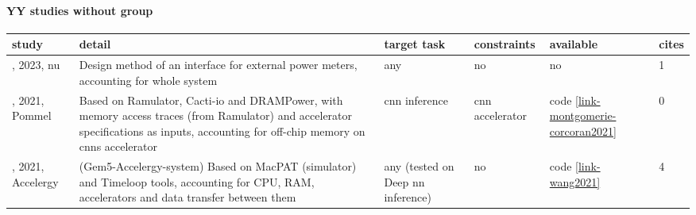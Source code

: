 \paragraph{YY studies without group} 
 \label{tab:YY-other} 
\begin{longtable}{|>{\raggedright\arraybackslash}p{2cm}|p{5.9cm}|>{\raggedright\arraybackslash}p{1.85cm}|>{\raggedright\arraybackslash}p{2cm}|>{\raggedright\arraybackslash}p{1.5cm}|p{0.7cm}|}
\toprule
\bfseries study & \bfseries detail & \bfseries target task & \bfseries constraints & \bfseries available & \bfseries cites \\
\midrule 
\endhead
\cite{ortega2023}, 2023, \acrshort{nu} & Design method of an interface for external power meters, accounting for whole system & any & no & no & 1 \\
\cite{montgomerie-corcoran2021}, 2021, Pommel & Based on Ramulator, Cacti-io and DRAMPower, with memory access traces (from Ramulator) and accelerator specifications as inputs, accounting for off-chip memory on \acrshort{cnn}s accelerator & \acrshort{cnn} inference & \acrshort{cnn} accelerator & code \href{https://github.com/AlexMontgomerie/pommel}{\ref*{link-montgomerie-corcoran2021}} & 0 \\
\cite{wang2021}, 2021, Accelergy & (Gem5-Accelergy-system) Based on MacPAT (simulator) and Timeloop tools, accounting for CPU, RAM, accelerators and data transfer between them & any (tested on Deep \acrshort{nn} inference) & no & code \href{https://github.com/Accelergy-Project/accelergy}{\ref*{link-wang2021}} & 4 \\
\bottomrule
\end{longtable}

